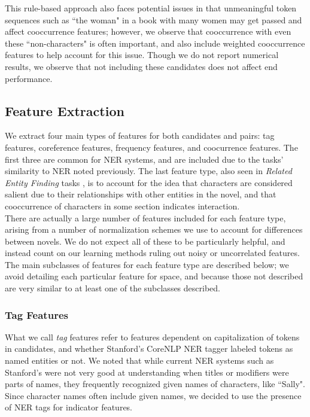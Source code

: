 \documentclass[12pt]{article}
\begin{document}
        This rule-based approach also faces potential issues in that unmeaningful token sequences such as
        ``the woman" in a book with many women may get passed and affect cooccurrence features; however,
        we observe that cooccurrence with even these ``non-characters" is often important, and also
        include weighted cooccurrence features to help account for this issue. Though we do not
        report numerical results, we observe that not including these candidates does not affect 
        end performance.

    \subsection{Feature Extraction}

        We extract four main types of features for both candidates and pairs: tag features,
        coreference features, frequency features, and coocurrence features. The first three are common
        for NER systems, and are included due to the tasks' similarity to NER noted previously. The last
        feature type, also seen in \emph{Related Entity Finding} tasks \cite{bron2009related,yang2009experiments}, is to account
        for the idea that characters are considered salient due to their relationships with other
        entities in the novel, and that cooccurrence of characters in some section indicates interaction. \\

        There are actually a large number of features included for each feature type, arising from a number
        of normalization schemes we use to account for differences between novels. We do not expect
        all of these to be particularly helpful, and instead count on our learning methods ruling out
        noisy or uncorrelated features. The main subclasses of features for each feature type 
        are described below; we avoid detailing each particular feature for space, and because
        those not described are very similar to at least one of the subclasses described.

        \subsubsection{Tag Features}
        
        What we call \emph{tag} features refer to features dependent on capitalization of tokens in
        candidates, and whether Stanford's CoreNLP NER tagger \cite{finkel2005incorporating} labeled tokens as 
        named entities or not. We noted that while current NER systems such as Stanford's were
        not very good at understanding when titles or modifiers were parts of names, they frequently
        recognized given names of characters, like ``Sally". Since character names often 
        include given names, we decided to use the presence of NER tags for indicator features. \\
\end{document}
